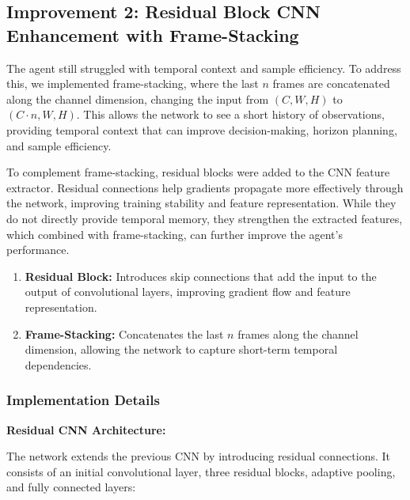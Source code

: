 \documentclass[twocolumn]{article}
\begin{document}
\subsection*{Improvement 2: Residual Block CNN Enhancement with Frame-Stacking}

The agent still struggled with temporal context and sample efficiency. To address this, we implemented frame-stacking, where the last $n$ frames are concatenated along the channel dimension, changing the input from $(C, W, H)$ to $(C \cdot n, W, H)$. This allows the network to see a short history of observations, providing temporal context that can improve decision-making, horizon planning, and sample efficiency.

To complement frame-stacking, residual blocks were added to the CNN feature extractor. Residual connections help gradients propagate more effectively through the network, improving training stability and feature representation. While they do not directly provide temporal memory, they strengthen the extracted features, which combined with frame-stacking, can further improve the agent's performance. \parencite{zagoruyko2016wide}

\begin{enumerate}
	\item \textbf{Residual Block:} Introduces skip connections that add the input to the output of convolutional layers, improving gradient flow and feature representation.
	\item \textbf{Frame-Stacking:} Concatenates the last $n$ frames along the channel dimension, allowing the network to capture short-term temporal dependencies.
\end{enumerate}

\subsubsection*{Implementation Details}

\textbf{Residual CNN Architecture:}

The network extends the previous CNN by introducing residual connections. It consists of an initial convolutional layer, three residual blocks, adaptive pooling, and fully connected layers:
\end{document}
